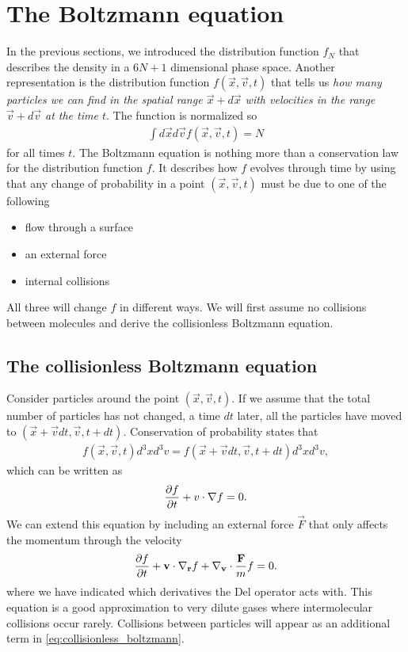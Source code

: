 \section{The Boltzmann equation}
\label{sec:boltzmann_equation}
In the previous sections, we introduced the distribution function $f_N$ that describes the density in a $6N+1$ dimensional phase space. Another representation is the distribution function $f(\vec x, \vec v, t)$ that tells us \textit{how many particles we can find in the spatial range $\vec x + d\vec x$ with velocities in the range $\vec v + d\vec v$ at the time $t$}. The function is normalized so
\begin{align}
	\int d\vec x d\vec v f(\vec x, \vec v, t) = N
\end{align}
for all times $t$. The Boltzmann equation is nothing more than a conservation law for the distribution function $f$. It describes how $f$ evolves through time by using that any change of probability in a point $(\vec x, \vec v, t)$ must be due to one of the following
\begin{itemize}
	\item flow through a surface
	\item an external force
	\item internal collisions
\end{itemize}
All three will change $f$ in different ways. We will first assume no collisions between molecules and derive the collisionless Boltzmann equation. 
\subsection{The collisionless Boltzmann equation}
Consider particles around the point $(\vec x,\vec v, t)$. If we assume that the total number of particles has not changed, a time $dt$ later, all the particles have moved to $(\vec x + \vec vdt, \vec v, t + dt)$. Conservation of probability states that
\begin{align}
	f(\vec x, \vec v, t) d^3xd^3v = f(\vec x + \vec v dt, \vec v, t + dt)d^3xd^3v,
\end{align}
which can be written as
\begin{align}
	\frac{\partial f}{\partial t} + v\cdot\nabla f = 0.
\end{align}
We can extend this equation by including an external force $\vec F$ that only affects the momentum through the velocity
\begin{align}
	\label{eq:collisionless_boltzmann}
	\frac{\partial f}{\partial t} + \mathbf v\cdot\nabla_\mathbf r f + \nabla_\mathbf v \cdot {\mathbf F\over m}f = 0.
\end{align}
where we have indicated which derivatives the Del operator acts with. This equation is a good approximation to very dilute gases where intermolecular collisions occur rarely. Collisions between particles will appear as an additional term in \eqref{eq:collisionless_boltzmann}.
